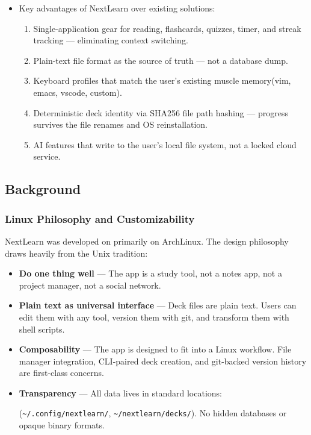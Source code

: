 \documentclass[14pt]{article}
\begin{document}
\begin{itemize}
\item Key advantages of NextLearn over existing solutions:
\begin{enumerate}
\item Single-application gear for reading, flashcards, quizzes, timer, and streak tracking — eliminating context switching.
\item Plain-text file format as the source of truth — not a database dump.
\item Keyboard profiles that match the user's existing muscle memory(vim, emacs, vscode, custom).
\item Deterministic deck identity via SHA256 file path hashing — progress survives the file renames and OS reinstallation.
\item AI features that write to the user's local file system, not a locked cloud service.
\end{enumerate}
\end{itemize}

\newpage
\subsection{Background}
\label{sec:org4296122}
\subsubsection{Linux Philosophy and Customizability}
\label{sec:orga59b943}
NextLearn was developed on primarily on ArchLinux. The design
philosophy draws heavily from the Unix tradition:

\begin{itemize}
\item \textbf{\textbf{Do one thing well}} — The app is a study tool, not a notes app,
not a project manager, not a social network.
\item \textbf{\textbf{Plain text as universal interface}} — Deck files are plain text.
Users can edit them with any tool, version them with git, and
transform them with shell scripts.
\item \textbf{\textbf{Composability}} — The app is designed to fit into a Linux workflow.
File manager integration, CLI-paired deck creation, and
git-backed version history are first-class concerns.
\item \textbf{\textbf{Transparency}} — All data lives in standard locations:

(\texttt{\textasciitilde{}/.config/nextlearn/}, \texttt{\textasciitilde{}/nextlearn/decks/}). No hidden databases
or opaque binary formats.
\end{itemize}
\end{document}
